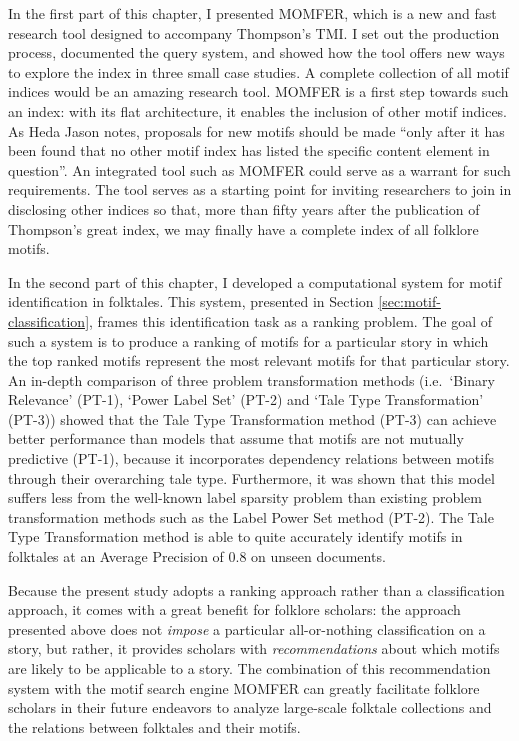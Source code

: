 In the first part of this chapter, I presented MOMFER, which is a new and fast research tool designed to accompany Thompson's TMI. I set out the production process, documented the query system, and showed how the tool offers new ways to explore the index in three small case studies. A complete collection of all motif indices would be an amazing research tool. MOMFER is a first step towards such an index: with its flat architecture, it enables the inclusion of other motif indices. As Heda Jason notes, proposals for new motifs should be made ``only after it has been found that no other motif index has listed the specific content element in question''\autocite[61]{jason:2000}. An integrated tool such as MOMFER could serve as a warrant for such requirements. The tool serves as a starting point for inviting researchers to join in disclosing other indices so that, more than fifty years after the publication of Thompson's great index, we may finally have a complete index of all folklore motifs.

In the second part of this chapter, I developed a computational system for motif identification in folktales. This system, presented in Section \ref{sec:motif-classification}, frames this identification task as a ranking problem. The goal of such a system is to produce a ranking of motifs for a particular story in which the top ranked motifs represent the most relevant motifs for that particular story. An in-depth comparison of three problem transformation methods (i.e.\ `Binary Relevance' (PT-1), `Power Label Set' (PT-2) and `Tale Type Transformation' (PT-3)) showed that the Tale Type Transformation method (PT-3) can achieve better performance than models that assume that motifs are not mutually predictive (PT-1), because it incorporates dependency relations between motifs through their overarching tale type. Furthermore, it was shown that this model suffers less from the well-known label sparsity problem than existing problem transformation methods such as the Label Power Set method (PT-2). The Tale Type Transformation method is able to quite accurately identify motifs in folktales at an Average Precision of 0.8 on unseen documents.

Because the present study adopts a ranking approach rather than a classification approach, it comes with a great benefit for folklore scholars: the approach presented above does not \emph{impose} a particular all-or-nothing classification on a story, but rather, it provides scholars with \emph{recommendations} about which motifs are likely to be applicable to a story. The combination of this recommendation system with the motif search engine MOMFER can greatly facilitate folklore scholars in their future endeavors to analyze large-scale folktale collections and the relations between folktales and their motifs.

